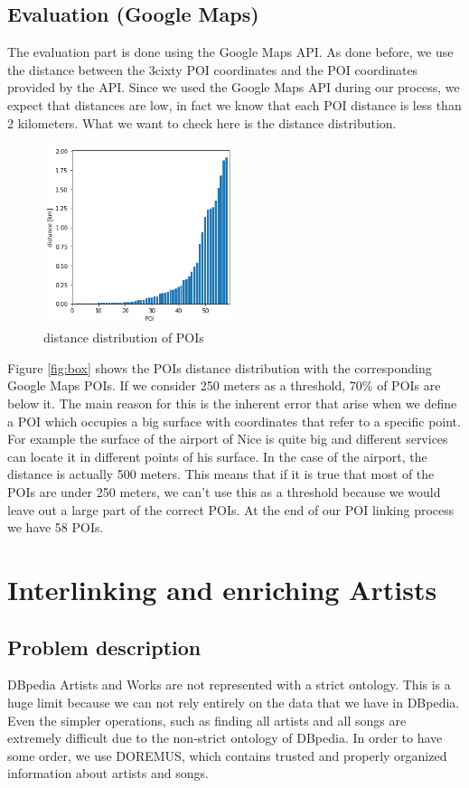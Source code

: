 \documentclass[paper=a4, fontsize=11pt]{scrartcl}
\begin{document}
\subsection{Evaluation (Google Maps)}
The evaluation part is done using the Google Maps API. As done before, we use the distance between the 3cixty POI coordinates and the POI coordinates provided by the API. Since we used the Google Maps API during our process, we expect that distances are low, in fact we know that each POI distance is less than 2 kilometers. What we want to check here is the distance distribution.

\begin{figure}[!htb]
  \centering
    \includegraphics[width=0.5\textwidth]{images/distance.png}
    \caption{distance distribution of POIs}
    \label{fig:poidist}
\end{figure}

Figure \ref{fig:box} shows the POIs distance distribution with the corresponding Google Maps POIs. If we consider 250 meters as a threshold, 70\% of POIs are below it. The main reason for this is the inherent error that arise when we define a POI which occupies a big surface with coordinates that refer to a specific point. For example the surface of the airport of Nice is quite big and different services can locate it in different points of his surface. In the case of the airport, the distance is actually 500 meters. This means that if it is true that most of the POIs are under 250 meters, we can't use this as a threshold because we would leave out a large part of the correct POIs.
At the end of our POI linking process we have 58 POIs.

\section{Interlinking and enriching Artists}
\subsection{Problem description}
DBpedia Artists and Works are not represented with a strict ontology.
This is a huge limit because we can not rely entirely on the data that we have in DBpedia. Even the simpler operations, such as finding all artists and all songs are extremely difficult due to the non-strict ontology of DBpedia. In order to have some order, we use DOREMUS, which contains trusted and properly organized information about artists and songs.
\end{document}
